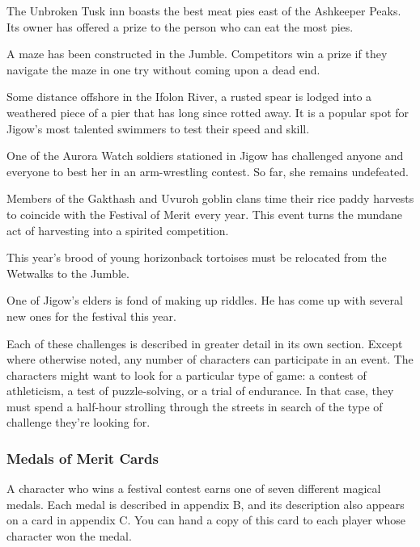 \documentclass[10pt,a4paper,twoside,bg=print,twocolumn,openany,nodeprecatedcode]{dndbook}
\begin{document}
\begin{description}[nolistsep]
\item[J1: Best Pies in the Jumble.]
The Unbroken Tusk inn boasts the best meat pies east of the Ashkeeper Peaks. Its owner has offered a prize to the person who can eat the most pies.
\item[J2: One-Shot Solution.]
A maze has been constructed in the Jumble. Competitors win a prize if they navigate the maze in one try without coming upon a dead end.
\item[J3: The Ifolon Plunge.]
Some distance offshore in the Ifolon River, a rusted spear is lodged into a weathered piece of a pier that has long since rotted away. It is a popular spot for Jigow's most talented swimmers to test their speed and skill.
\item[J4: Call to Arms.]
One of the Aurora Watch soldiers stationed in Jigow has challenged anyone and everyone to best her in an arm-wrestling contest. So far, she remains undefeated.
\item[J5: Wetwalks Paddywhack.]
Members of the Gakthash and Uvuroh goblin clans time their rice paddy harvests to coincide with the Festival of Merit every year. This event turns the mundane act of harvesting into a spirited competition.
\item[J6: Herding the Horizonbacks.]
This year's brood of young horizonback tortoises must be relocated from the Wetwalks to the Jumble.
\item[J7: Riddles and Rhymes.]
One of Jigow's elders is fond of making up riddles. He has come up with several new ones for the festival this year.
\end{description}

Each of these challenges is described in greater detail in its own section. Except where otherwise noted, any number of characters can participate in an event.
The characters might want to look for a particular type of game: a contest of athleticism, a test of puzzle-solving, or a trial of endurance. In that case, they must spend a half-hour strolling through the streets in search of the type of challenge they're looking for.
\subsubsection{Medals of Merit Cards}
A character who wins a festival contest earns one of seven different magical medals. Each medal is described in appendix B, and its description also appears on a card in appendix C. You can hand a copy of this card to each player whose character won the medal.
\end{document}
